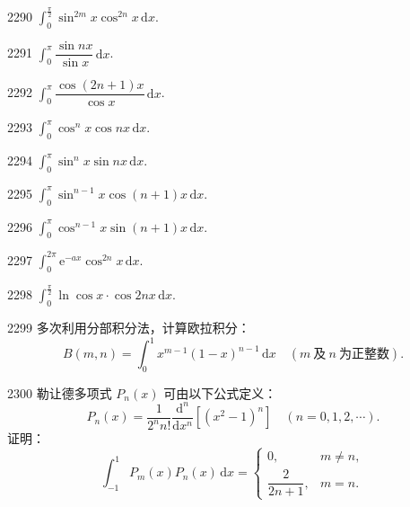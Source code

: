 \begin{prob}[S]{2290}
$\int_0^{\frac{\pi}{2}} \sin^{2m} x \cos^{2n} x\,\mathrm{d}x$.
\end{prob}

\begin{prob}[S]{2291}
$\int_0^\pi \dfrac{\sin nx}{\sin x}\,\mathrm{d}x$.
\end{prob}

\begin{prob}[S]{2292}
$\int_0^\pi \dfrac{\cos(2n+1)x}{\cos x}\,\mathrm{d}x$.
\end{prob}

\begin{prob}[S]{2293}
$\int_0^\pi \cos^n x \cos nx\,\mathrm{d}x$.
\end{prob}

\begin{prob}[S]{2294}
$\int_0^\pi \sin^n x \sin nx\,\mathrm{d}x$.
\end{prob}


\begin{prob}[S]{2295}
$\int_0^\pi \sin^{n-1} x \cos(n+1)x\,\mathrm{d}x$.
\end{prob}

\begin{prob}[S]{2296}
$\int_0^\pi \cos^{n-1} x \sin(n+1)x\,\mathrm{d}x$.
\end{prob}

\begin{prob}[S]{2297}
$\int_0^{2\pi} \mathrm{e}^{-ax}\cos^{2n} x\,\mathrm{d}x$.
\end{prob}

\begin{prob}[S]{2298}
$\int_0^{\frac{\pi}{2}} \ln \cos x \cdot \cos 2nx\,\mathrm{d}x$.
\end{prob}

\begin{prob}[M]{2299}
多次利用分部积分法，计算欧拉积分：
\[ B(m, n) = \int_0^1 x^{m-1}(1-x)^{n-1}\,\mathrm{d}x \quad (m\ \text{及}\ n\ \text{为正整数}). \]
\end{prob}

\begin{prob}[M]{2300}
勒让德多项式 $P_n(x)$ 可由以下公式定义：
\[ P_n(x) = \frac{1}{2^n n!} \frac{\mathrm{d}^n}{\mathrm{d}x^n}\left[(x^2-1)^n\right] \quad (n = 0, 1, 2, \cdots). \]
证明：
\[ \int_{-1}^1 P_m(x)P_n(x)\,\mathrm{d}x = \begin{cases} 0, & m \neq n, \\ \dfrac{2}{2n+1}, & m = n. \end{cases} \]
\end{prob}

